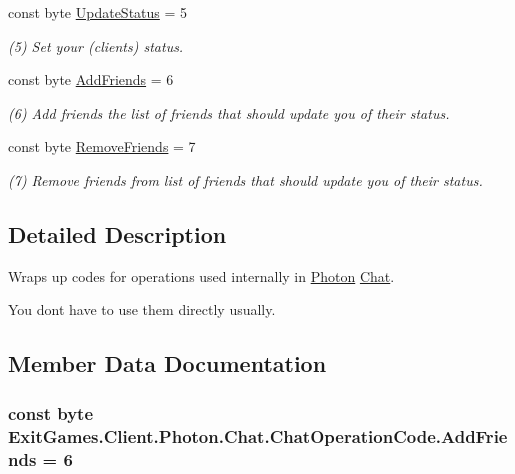\begin{DoxyCompactItemize}
const byte \hyperlink{class_exit_games_1_1_client_1_1_photon_1_1_chat_1_1_chat_operation_code_a76eac50d9c1919c0dfd65cde6d0f2464}{Update\+Status} = 5
\begin{DoxyCompactList}\small\item\em (5) Set your (client\textquotesingle{}s) status.\end{DoxyCompactList}\item 
const byte \hyperlink{class_exit_games_1_1_client_1_1_photon_1_1_chat_1_1_chat_operation_code_ade61a55585e9a364cdfaabc6c8b55e5a}{Add\+Friends} = 6
\begin{DoxyCompactList}\small\item\em (6) Add friends the list of friends that should update you of their status.\end{DoxyCompactList}\item 
const byte \hyperlink{class_exit_games_1_1_client_1_1_photon_1_1_chat_1_1_chat_operation_code_a5adb2a4d7ca5b4edd59bef60d9d1ccae}{Remove\+Friends} = 7
\begin{DoxyCompactList}\small\item\em (7) Remove friends from list of friends that should update you of their status.\end{DoxyCompactList}\end{DoxyCompactItemize}


\subsection{Detailed Description}
Wraps up codes for operations used internally in \hyperlink{namespace_exit_games_1_1_client_1_1_photon}{Photon} \hyperlink{namespace_exit_games_1_1_client_1_1_photon_1_1_chat}{Chat}. 

You don\textquotesingle{}t have to use them directly usually. 

\subsection{Member Data Documentation}
\subsubsection[{\texorpdfstring{Add\+Friends}{AddFriends}}]{\setlength{\rightskip}{0pt plus 5cm}const byte Exit\+Games.\+Client.\+Photon.\+Chat.\+Chat\+Operation\+Code.\+Add\+Friends = 6}\hypertarget{class_exit_games_1_1_client_1_1_photon_1_1_chat_1_1_chat_operation_code_ade61a55585e9a364cdfaabc6c8b55e5a}{}\label{class_exit_games_1_1_client_1_1_photon_1_1_chat_1_1_chat_operation_code_ade61a55585e9a364cdfaabc6c8b55e5a}


